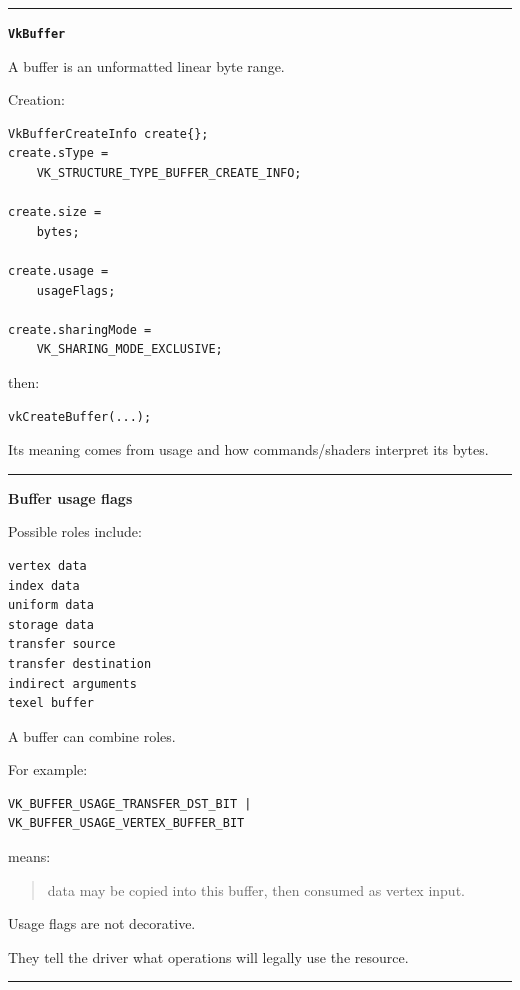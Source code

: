 \begin{center}\rule{0.5\linewidth}{0.5pt}\end{center}

\textbf{\texttt{VkBuffer}}

A buffer is an unformatted linear byte range.

Creation:

\begin{verbatim}
VkBufferCreateInfo create{};
create.sType =
    VK_STRUCTURE_TYPE_BUFFER_CREATE_INFO;

create.size =
    bytes;

create.usage =
    usageFlags;

create.sharingMode =
    VK_SHARING_MODE_EXCLUSIVE;
\end{verbatim}

then:

\begin{verbatim}
vkCreateBuffer(...);
\end{verbatim}

Its meaning comes from usage and how commands/shaders interpret its bytes.

\begin{center}\rule{0.5\linewidth}{0.5pt}\end{center}

\textbf{Buffer usage flags}

Possible roles include:

\begin{verbatim}
vertex data
index data
uniform data
storage data
transfer source
transfer destination
indirect arguments
texel buffer
\end{verbatim}

A buffer can combine roles.

For example:

\begin{verbatim}
VK_BUFFER_USAGE_TRANSFER_DST_BIT |
VK_BUFFER_USAGE_VERTEX_BUFFER_BIT
\end{verbatim}

means:

\begin{quote}
data may be copied into this buffer, then consumed as vertex input.
\end{quote}

Usage flags are not decorative.

They tell the driver what operations will legally use the resource.

\begin{center}\rule{0.5\linewidth}{0.5pt}\end{center}

